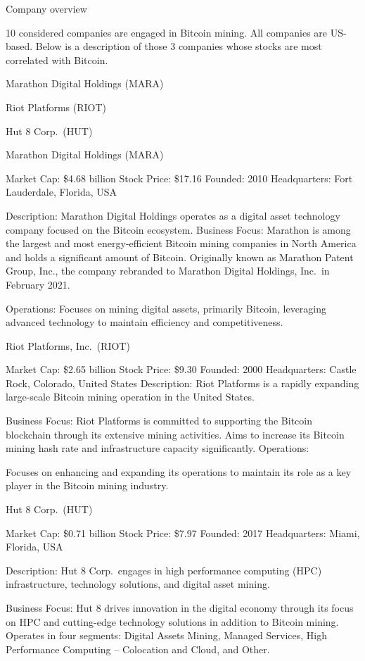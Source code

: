 \documentclass[11pt]{article}
\begin{document}
    Company overview

10 considered companies are engaged in Bitcoin mining. All companies are
US-based. Below is a description of those 3 companies whose stocks are
most correlated with Bitcoin.

Marathon Digital Holdings (MARA)

Riot Platforms (RIOT)

Hut 8 Corp.~(HUT)

Marathon Digital Holdings (MARA)

Market Cap: \$4.68 billion Stock Price: \$17.16 Founded: 2010
Headquarters: Fort Lauderdale, Florida, USA

Description: Marathon Digital Holdings operates as a digital asset
technology company focused on the Bitcoin ecosystem. Business Focus:
Marathon is among the largest and most energy-efficient Bitcoin mining
companies in North America and holds a significant amount of Bitcoin.
Originally known as Marathon Patent Group, Inc., the company rebranded
to Marathon Digital Holdings, Inc.~in February 2021.

Operations: Focuses on mining digital assets, primarily Bitcoin,
leveraging advanced technology to maintain efficiency and
competitiveness.

Riot Platforms, Inc.~(RIOT)

Market Cap: \$2.65 billion Stock Price: \$9.30 Founded: 2000
Headquarters: Castle Rock, Colorado, United States Description: Riot
Platforms is a rapidly expanding large-scale Bitcoin mining operation in
the United States.

Business Focus: Riot Platforms is committed to supporting the Bitcoin
blockchain through its extensive mining activities. Aims to increase its
Bitcoin mining hash rate and infrastructure capacity significantly.
Operations:

Focuses on enhancing and expanding its operations to maintain its role
as a key player in the Bitcoin mining industry.

Hut 8 Corp.~(HUT)

Market Cap: \$0.71 billion Stock Price: \$7.97 Founded: 2017
Headquarters: Miami, Florida, USA

Description: Hut 8 Corp.~engages in high performance computing (HPC)
infrastructure, technology solutions, and digital asset mining.

Business Focus: Hut 8 drives innovation in the digital economy through
its focus on HPC and cutting-edge technology solutions in addition to
Bitcoin mining. Operates in four segments: Digital Assets Mining,
Managed Services, High Performance Computing -- Colocation and Cloud,
and Other.
\end{document}

